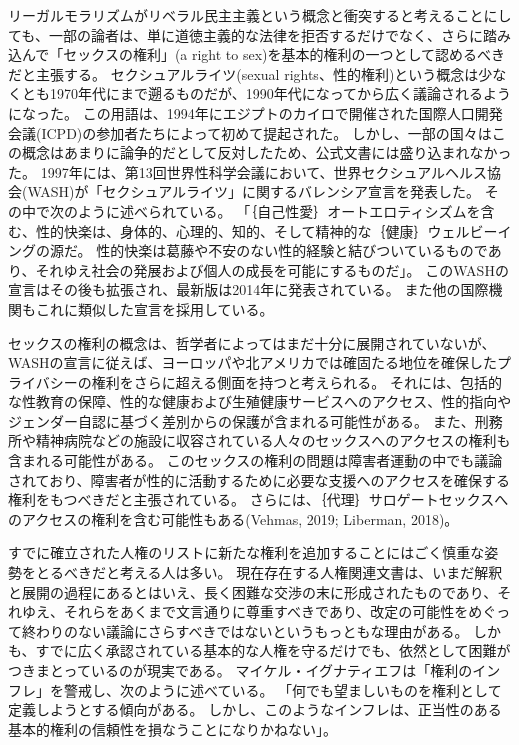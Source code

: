 \documentclass[paper=a4,book,openany]{jlreq}
\begin{document}
リーガルモラリズムがリベラル民主主義という概念と衝突すると考えることにしても、一部の論者は、単に道徳主義的な法律を拒否するだけでなく、さらに踏み込んで「セックスの権利」(a right to sex)を基本的権利の一つとして認めるべきだと主張する。
セクシュアルライツ(sexual rights、性的権利)という概念は少なくとも1970年代にまで遡るものだが、1990年代になってから広く議論されるようになった。
この用語は、1994年にエジプトのカイロで開催された国際人口開発会議(ICPD)の参加者たちによって初めて提起された。
しかし、一部の国々はこの概念はあまりに論争的だとして反対したため、公式文書には盛り込まれなかった\citep{correa07:_global_persp_sexual_right}。
1997年には、第13回世界性科学会議において、世界セクシュアルヘルス協会(WASH)が「セクシュアルライツ」に関するバレンシア宣言を発表した。
その中で次のように述べられている。
「｛自己性愛｝{オートエロティシズム}を含む、性的快楽は、身体的、心理的、知的、そして精神的な｛健康｝{ウェルビーイング}の源だ。
性的快楽は葛藤や不安のない性的経験と結びついているものであり、それゆえ社会の発展および個人の成長を可能にするものだ」\citep{WASH97:_valen_declar_sexual_right}。
このWASHの宣言はその後も拡張され、最新版は2014年に発表されている。
また他の国際機関もこれに類似した宣言を採用している。

セックスの権利の概念は、哲学者によってはまだ十分に展開されていないが、WASHの宣言に従えば、ヨーロッパや北アメリカでは確固たる地位を確保したプライバシーの権利をさらに超える側面を持つと考えられる。
それには、包括的な性教育の保障、性的な健康および生殖健康サービスへのアクセス、性的指向やジェンダー自認に基づく差別からの保護が含まれる可能性がある。
また、刑務所や精神病院などの施設に収容されている人々のセックスへのアクセスの権利も含まれる可能性がある。
このセックスの権利の問題は障害者運動の中でも議論されており、障害者が性的に活動するために必要な支援へのアクセスを確保する権利をもつべきだと主張されている。
さらには、｛代理｝{サロゲート}セックスへのアクセスの権利を含む可能性もある(Vehmas, 2019; Liberman, 2018)。
\nocite{vehmas19:_person_profoun_intel_disab_their_right_sex}\nocite{liberman18:_disab_sex_right_scope_sexual_exclus}

すでに確立された人権のリストに新たな権利を追加することにはごく慎重な姿勢をとるべきだと考える人は多い。
現在存在する人権関連文書は、いまだ解釈と展開の過程にあるとはいえ、長く困難な交渉の末に形成されたものであり、それゆえ、それらをあくまで文言通りに尊重すべきであり、改定の可能性をめぐって終わりのない議論にさらすべきではないというもっともな理由がある。
しかも、すでに広く承認されている基本的な人権を守るだけでも、依然として困難がつきまとっているのが現実である。
マイケル・イグナティエフは「権利のインフレ」を警戒し、次のように述べている。
「何でも望ましいものを権利として定義しようとする傾向がある。
しかし、このようなインフレは、正当性のある基本的権利の信頼性を損なうことになりかねない」\citep[p.90]{ignatieff03:_human_right_polit_idolat}。
\end{document}
